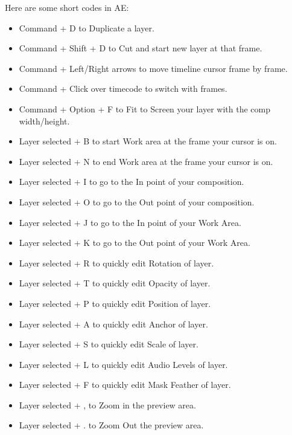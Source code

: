 \begin{fullwidth}
\clearpage
Here are some short codes in AE:

\begin{itemize}
\item Command + D to Duplicate a layer.
\item Command + Shift + D to Cut and start new layer at that frame.
\item Command + Left/Right arrows to move timeline cursor frame by frame.
\item Command + Click over timecode to switch with frames.
\item Command + Option + F to Fit to Screen your layer with the comp width/height.
\item Layer selected + B to start Work area at the frame your cursor is on.
\item Layer selected + N to end Work area at the frame your cursor is on.
\item Layer selected + I to go to the In point of your composition.
\item Layer selected + O to go to the Out point of your composition.
\item Layer selected + J to go to the In point of your Work Area.
\item Layer selected + K to go to the Out point of your Work Area.
\item Layer selected + R to quickly edit Rotation of layer.
\item Layer selected + T to quickly edit Opacity of layer.
\item Layer selected + P to quickly edit Position of layer.
\item Layer selected + A to quickly edit Anchor of layer.
\item Layer selected + S to quickly edit Scale of layer.
\item Layer selected + L to quickly edit Audio Levels of layer.
\item Layer selected + F to quickly edit Mask Feather of layer.
\item Layer selected + , to Zoom in the preview area.
\item Layer selected + . to Zoom Out the preview area.
\end{itemize}

\clearpage
\end{fullwidth}